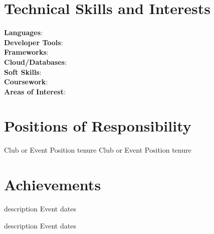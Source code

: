\documentclass{article}
\begin{document}
\section{\textbf{Technical Skills and Interests}}
 \begin{itemize}[leftmargin=0.05in, label={}]
    \small{\item{
     \textbf{Languages}{: } \\
     \textbf{Developer Tools}{: } \\
     \textbf{Frameworks}{: } \\
     \textbf{Cloud/Databases}{: } \\
     \textbf{Soft Skills}{: } \\
     \textbf{Coursework}{: } \\
     \textbf{Areas of Interest}{: } \\
    }}
 \end{itemize}
 \vspace{-16pt}



\section{\textbf{Positions of Responsibility}}
\vspace{-0.4mm}
\resumeSubHeadingListStart
{} %
    {Club or Event} %
    {Position tenure} %
    {Club or Event} %
    {Position tenure} %
\resumeSubHeadingListEnd
\vspace{-5mm}




\section{\textbf{Achievements}}
\vspace{-0.4mm}
\resumeSubHeadingListStart
{} %
    {description} %
    {Event dates} %
    
    {description} %
    {Event dates} %
\resumeSubHeadingListEnd
\vspace{-5mm}
\setlength{\footskip}{4.08003pt}


\end{document}
